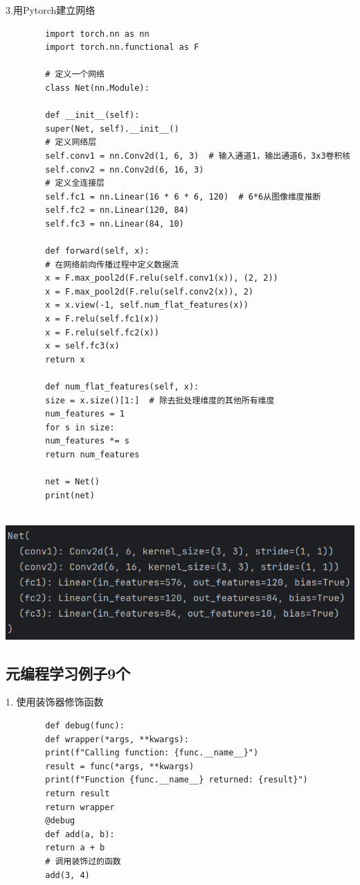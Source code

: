 \documentclass{article}
\begin{document}
	3.用Pytorch建立网络
	\begin{verbatim}
		import torch.nn as nn
		import torch.nn.functional as F
		
		# 定义一个网络
		class Net(nn.Module):
		
		def __init__(self):
		super(Net, self).__init__()
		# 定义网络层
		self.conv1 = nn.Conv2d(1, 6, 3)  # 输入通道1，输出通道6，3x3卷积核
		self.conv2 = nn.Conv2d(6, 16, 3)
		# 定义全连接层
		self.fc1 = nn.Linear(16 * 6 * 6, 120)  # 6*6从图像维度推断
		self.fc2 = nn.Linear(120, 84)
		self.fc3 = nn.Linear(84, 10)
		
		def forward(self, x):
		# 在网络前向传播过程中定义数据流
		x = F.max_pool2d(F.relu(self.conv1(x)), (2, 2))
		x = F.max_pool2d(F.relu(self.conv2(x)), 2)
		x = x.view(-1, self.num_flat_features(x))
		x = F.relu(self.fc1(x))
		x = F.relu(self.fc2(x))
		x = self.fc3(x)
		return x
		
		def num_flat_features(self, x):
		size = x.size()[1:]  # 除去批处理维度的其他所有维度
		num_features = 1
		for s in size:
		num_features *= s
		return num_features
		
		net = Net()
		print(net)
		
	\end{verbatim}
	
	\noindent
	\begin{minipage}{\linewidth}
		\centering
		\includegraphics[width=0.5\linewidth]{example3.png}
		\label{fig:example}
	\end{minipage}
	
	\subsection{元编程学习例子9个}
	
	1. 使用装饰器修饰函数
	\begin{verbatim}
		def debug(func):
		def wrapper(*args, **kwargs):
		print(f"Calling function: {func.__name__}")
		result = func(*args, **kwargs)
		print(f"Function {func.__name__} returned: {result}")
		return result
		return wrapper
		@debug
		def add(a, b):
		return a + b
		# 调用装饰过的函数
		add(3, 4)
	\end{verbatim}
	
\end{document}
